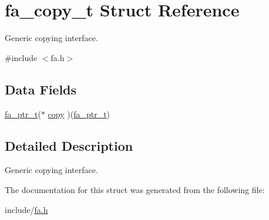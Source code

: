 \hypertarget{structfa__copy__t}{\section{fa\-\_\-copy\-\_\-t Struct Reference}
\label{structfa__copy__t}
}


Generic copying interface.  




{\ttfamily \#include $<$fa.\-h$>$}

\subsection*{Data Fields}
\begin{DoxyCompactItemize}
\item 
\hyperlink{group___fa_ga915ddeae99ad7568b273d2b876425197}{fa\-\_\-ptr\-\_\-t}($\ast$ \hyperlink{structfa__copy__t_aec49e1e735009a0dbc8810c784caacb2}{copy} )(\hyperlink{group___fa_ga915ddeae99ad7568b273d2b876425197}{fa\-\_\-ptr\-\_\-t})
\end{DoxyCompactItemize}


\subsection{Detailed Description}
Generic copying interface. 

The documentation for this struct was generated from the following file\-:\begin{DoxyCompactItemize}
\item 
include/\hyperlink{fa_8h}{fa.\-h}\end{DoxyCompactItemize}
